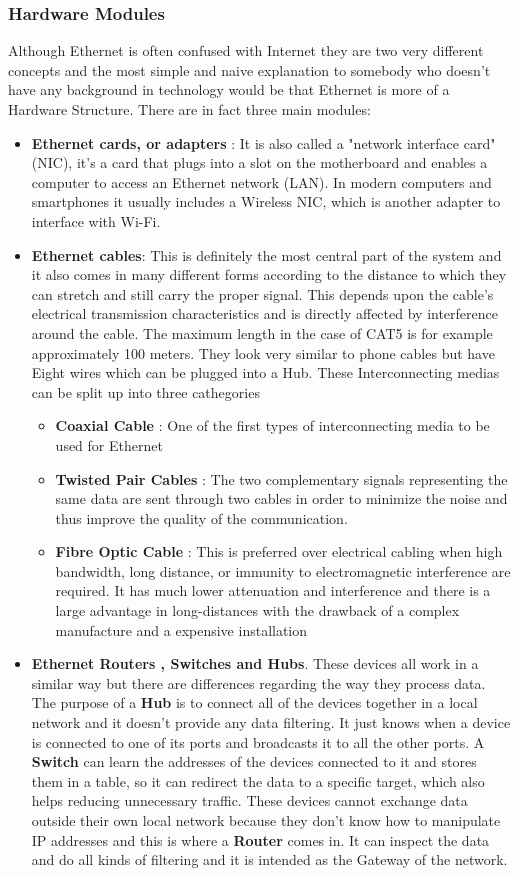 \documentclass{article}
\begin{document}
\subsubsection{Hardware Modules}
Although Ethernet is often confused with Internet they are two very different concepts and the most simple and naive explanation to somebody who doesn't have any background in technology would be that Ethernet is more of a Hardware Structure. 
There are in fact three main modules: 
\begin{itemize}
\item \textbf{Ethernet cards, or adapters} :  It is also called a "network interface card" (NIC), it's a card that plugs into a slot on the motherboard and enables a computer to access an Ethernet network (LAN). In modern computers and smartphones it usually includes a Wireless NIC, which is another adapter to interface with Wi-Fi.
\item \textbf{Ethernet cables}: This is definitely the most central part of the system and it also comes in many different forms according to the distance to which they can stretch and still carry the proper signal. This depends upon the cable's electrical transmission characteristics and is directly affected by interference around the cable. The maximum length in the case of CAT5 is for example approximately 100 meters. They look very similar to phone cables but have Eight wires which can be plugged into a Hub. These Interconnecting medias can be split up into three cathegories
\begin{itemize}
\item \textbf{Coaxial Cable} : One of the first types of interconnecting media to be used for Ethernet
\item \textbf{Twisted Pair Cables} : The two complementary signals representing the same data are sent through two cables in order to minimize the noise and thus improve the quality of the communication.
\item \textbf{Fibre Optic Cable} : This is preferred over electrical cabling when high bandwidth, long distance, or immunity to electromagnetic interference are required. It has much lower attenuation and interference and there is a large advantage in long-distances with the drawback of a complex manufacture and a expensive installation
\end{itemize}
\item \textbf{Ethernet Routers , Switches and Hubs}. These devices all work in a similar way but there are differences regarding the way they process data. The purpose of a \textbf{Hub} is to connect all of the devices together in a local network and it  doesn't provide any data filtering.  It just knows when a device is connected to one of its ports and broadcasts it to all the other ports. A \textbf{Switch} can learn the addresses of the devices connected to it and stores them in a table, so it can redirect the data to a specific target, which also helps reducing unnecessary traffic. These devices cannot exchange data outside their own local network because they don't know how to manipulate IP addresses and this is where a \textbf{Router} comes in. It can inspect the data and do all kinds of filtering and it is intended as the Gateway of the network.
\end{itemize}
\end{document}
